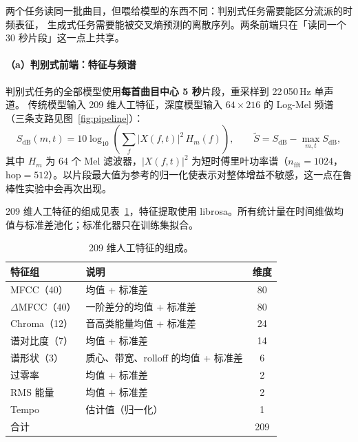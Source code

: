 \documentclass[UTF8,10pt,a4paper]{ctexart}
\begin{document}
两个任务读同一批曲目，但喂给模型的东西不同：判别式任务需要能区分流派的时频表征，
生成式任务需要能被交叉熵预测的离散序列。两条前端只在「读同一个 30 秒片段」这一点上共享。

\paragraph{（a）判别式前端：特征与频谱}
判别式任务的全部模型使用\textbf{每首曲目中心 5 秒}片段，重采样到 22\,050\,Hz 单声道。
传统模型输入 209 维人工特征，深度模型输入 $64\times216$ 的 Log-Mel 频谱（三条支路见图~\ref{fig:pipeline}）：
\begin{equation}
  S_{\mathrm{dB}}(m,t)=10\log_{10}\!\left(\sum_{f} |X(f,t)|^{2}\,H_{m}(f)\right),\qquad
  \tilde{S}=S_{\mathrm{dB}}-\max_{m,t} S_{\mathrm{dB}},
\end{equation}
其中 $H_m$ 为 64 个 Mel 滤波器，$|X(f,t)|^2$ 为短时傅里叶功率谱（$n_{\text{fft}}=1024$，hop$=512$）。以片段最大值为参考的归一化使表示对整体增益不敏感，这一点在鲁棒性实验中会再次出现。

209 维人工特征的组成见表~\ref{tab:features}，特征提取使用 librosa\cite{mcfee2015librosa}。所有统计量在时间维做均值与标准差池化；标准化器只在训练集拟合。

\begin{table}[H]
\centering\small
\caption{209 维人工特征的组成。}
\label{tab:features}
\begin{tabular}{llc}
\toprule
特征组 & 说明 & 维度\\
\midrule
MFCC（40） & 均值 + 标准差 & 80\\
$\Delta$MFCC（40） & 一阶差分的均值 + 标准差 & 80\\
Chroma（12） & 音高类能量均值 + 标准差 & 24\\
谱对比度（7） & 均值 + 标准差 & 14\\
谱形状（3） & 质心、带宽、rolloff 的均值 + 标准差 & 6\\
过零率 & 均值 + 标准差 & 2\\
RMS 能量 & 均值 + 标准差 & 2\\
Tempo & 估计值（归一化） & 1\\
\midrule
合计 & & 209\\
\bottomrule
\end{tabular}
\end{table}
\end{document}
